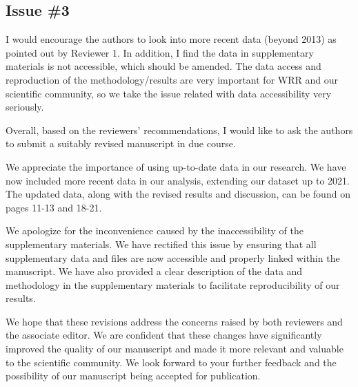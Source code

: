 \subsection{Issue \#3}
\RC{} I would encourage the authors to look into more recent data (beyond 2013) as pointed out by Reviewer 1. In addition, I find the data in supplementary materials is not accessible, which should be amended. The data access and reproduction of the methodology/results are very important for WRR and our scientific community, so we take the issue related with data accessibility very seriously.

\RC*{} Overall, based on the reviewers' recommendations, I would like to ask the authors to submit a suitably revised manuscript in due course.

\AR{} We appreciate the importance of using up-to-date data in our research. We have now included more recent data in our analysis, extending our dataset up to 2021. The updated data, along with the revised results and discussion, can be found on pages 11-13 and 18-21.

\AR*{} We apologize for the inconvenience caused by the inaccessibility of the supplementary materials. We have rectified this issue by ensuring that all supplementary data and files are now accessible and properly linked within the manuscript. We have also provided a clear description of the data and methodology in the supplementary materials to facilitate reproducibility of our results.

\AR*{} We hope that these revisions address the concerns raised by both reviewers and the associate editor. We are confident that these changes have significantly improved the quality of our manuscript and made it more relevant and valuable to the scientific community. We look forward to your further feedback and the possibility of our manuscript being accepted for publication.
